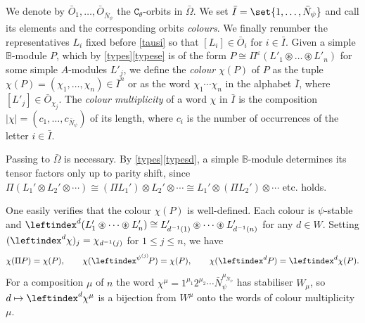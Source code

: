 \documentclass[a4paper,11pt]{amsart}
\numberwithin{equation}{subsection}
\theoremstyle{definition}
\theoremstyle{theorem}
\theoremstyle{remark}
\newcommand\Sym{W}
\newcommand{\Bo}{\mathbb{B}}
\begin{document}
\begin{Definition}\label{D:colours}
We denote by  $\bar O_1,\dots,\bar O_{\bar N_\psi}$ the $\mathtt{C}_\theta$-orbits  in  $\bar\Omega$.
 We set $\bar I=\set{1,\dots,\bar N_\psi}$ and call its elements and the corresponding orbits \emph{colours}.
 We finally renumber the representatives $L_i$ fixed before \autoref{tausi} so that $[L_i]\in\bar O_i$ for $i\in \bar I$. Given a simple $\Bo$-module $P$, which  by \autoref{types}\autoref{typese} is of the form $P\cong\Pi^{\varepsilon}(L'_1\circledast\dots\circledast L'_n)$ for some simple $A$-modules $L'_j$,
we define the \emph{colour} $\chi(P)$ of $P$ as the tuple $\chi(P)=(\chi_1,\ldots,\chi_n)\in \bar I^n$ or as the word $\chi_1\cdots\chi_n$ in the alphabet $\bar I$, where $[L'_j]\in\bar O_{\chi_j}$. The \emph{colour multiplicity} of a word $\chi$ in $\bar I$ is the composition $|\chi|=(c_1,\dots, c_{\bar N_\psi})$ of its length, where $c_i$ is the number of occurrences of the letter $i\in\bar I$.
\end{Definition}

\begin{Remark}
 Passing to
  $\bar\Omega$ is necessary. By \autoref{types}\autoref{typesd}, a simple $\Bo$-module
  determines its tensor factors only up to parity shift, since
  $\Pi(L_1'\otimes L_2'\otimes\cdots)\cong(\Pi L_1')\otimes
  L_2'\otimes\cdots\cong L_1'\otimes(\Pi
  L_2')\otimes\cdots$ etc. holds.
\end{Remark}

\begin{Remark}
One easily verifies that the colour $\chi(P)$ is well-defined. Each colour is $\psi$-stable and $\leftindex^{d}(L'_1\circledast\dots\circledast L'_n)\cong L'_{d^{-1}(1)}\circledast\dots\circledast L'_{d^{-1}(n)}$ for any $d\in\Sym$.  Setting $(\leftindex^{d}\chi)_j=\chi_{d^{-1}(j)}$ for $1\leq j\leq n$, we have
\begin{equation}\label{E:colours}
  \chi(\Pi P)=\chi(P),\qquad
  \chi(\leftindex^{\psi^{(j)}}\!P)=\chi(P),\qquad
  \chi(\leftindex^{d}P)=\leftindex^{d}\chi(P).
\end{equation}
 For a composition $\mu$ of $n$ the word $\chi^\mu=1^{\mu_1}2^{\mu_2}\cdots\bar N_\psi^{\mu_{\bar N_\psi}}$ has stabiliser $\Sym_\mu$, so $d\mapsto\leftindex^{d}\chi^\mu$ is a bijection from $\Sym^\mu$ onto the words of colour multiplicity $\mu$.
\end{Remark}
\end{document}
